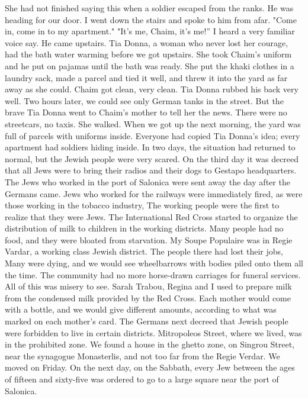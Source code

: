 She had not finished saying this when a soldier escaped from the ranks.
He was heading for our door.
I went down the stairs and spoke to him from afar.
"Come in, come in to my apartment."
"It's me, Chaim, it's me!” I  heard a very familiar voice say.
He came upstairs.
Tia Donna, a woman who never lost her courage, had the 
bath water warming before we got upstairs.
She took Chaim's uniform and he put on pajamas until the bath was ready.
She put the khaki clothes in a laundry sack, made a parcel and tied it well, and threw it into the yard as far away as she could.
Chaim got clean, very clean.
Tia Donna rubbed his back very well.
Two hours later, we could see only German tanks in the street.
But the brave Tia Donna went to Chaim's mother to tell her the news.
There were no streetcars, no taxis.
She walked.
When we got up the next morning, the yard was full of parcels with uniforms inside.
Everyone had copied Tia Donna's idea; every apartment 
had soldiers hiding inside.
In two days, the situation had returned to normal, but the Jewish people were very scared.
On the third day it was decreed that all Jews were to bring their radios and their dogs to Gestapo headquarters.
The Jews who worked in the port of Salonica were sent away the day after the Germans came.
Jews who worked for the railways were immediately 
fired, as were those working in the tobacco industry, The working people 
were the first to realize that they were Jews.
The International Red Cross started to organize the distribution of 
milk to children in the working districts.
Many people had no food, and 
they were bloated from starvation.
My Soupe Populaire was in Regie Vardar, a working class Jewish district.
The people there had lost their 
jobs, Many were dying, and we would see wheelbarrows with bodies piled 
onto them all the time.
The community had no more horse-drawn 
carriages for funeral services.
All of this was misery to see.
Sarah Trabou, Regina and I used to prepare milk from the condensed 
milk provided by the Red Cross.
Each mother would come with a bottle, 
and we would give different amounts, according to what was marked on 
each mother's card.
The Germans next decreed that Jewish people were forbidden to live 
in certain districts.
Mitropoleos Street, where we lived, was 
in the prohibited zone.
We found a house in the ghetto zone, on Singrou 
Street, near the synagogue Monasterlis, and not too far from the Regie 
Verdar.
We moved on Friday.
On the next day, on the Sabbath, every Jew 
between the ages of fifteen and sixty-five was ordered to go to a large 
square near the port of Salonica.

